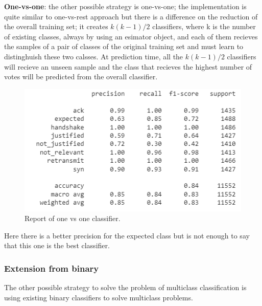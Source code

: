 \documentclass[sigconf]{acmart}
\begin{document}
    \textbf{One-vs-one}: the other possible strategy is one-vs-one; the implementation is quite similar to one-vs-rest approach but there is a difference on the reduction of the overall training set; it creates \(k (k-1)/2\) classifiers, where k is the number of existing classes, always by using an esimator object, and each of them recieves the samples of a pair of classes of the original training set and must learn to distinghuish these two calsses. At prediction time, all the \(k (k-1)/2\) classifiers will recieve an unseen sample and the class that recieves the highest number of votes will be predicted from the overall classifier.
    \begin{figure}[h!]
        \includegraphics[width=\linewidth]{img/one_vs_one_classifier.png}
        \caption{Report of one vs one classifier.}
        \label{fig:one_vs_one_classifier}
    \end{figure}
    Here there is a better precision for the expected class but is not enough to say that this one is the best classifier.

    \subsubsection{Extension from binary}
    The other possible strategy to solve the problem of multiclass classification is using existing binary classifiers to solve multiclass problems.
\end{document}

